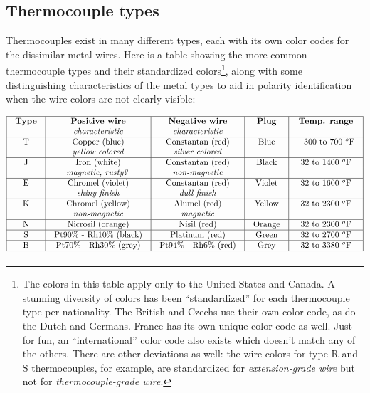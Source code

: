 \filbreak
\subsection{Thermocouple types}

Thermocouples exist in many different types, each with its own color codes for the dissimilar-metal wires.  Here is a table showing the more common thermocouple types and their standardized colors\footnote{The colors in this table apply only to the United States and Canada.  A stunning diversity of colors has been ``standardized'' for each thermocouple type per nationality.  The British and Czechs use their own color code, as do the Dutch and Germans.  France has its own unique color code as well.  Just for fun, an ``international'' color code also exists which doesn't match any of the others.  There are other deviations as well: the wire colors for type R and S thermocouples, for example, are standardized for \textit{extension-grade wire} but not for \textit{thermocouple-grade wire}.}, along with some distinguishing characteristics of the metal types to aid in polarity identification when the wire colors are not clearly visible:


$$\vbox{\offinterlineskip
\halign{\strut
\vrule \quad\hfil # \ \hfil & 
\vrule \quad\hfil # \ \hfil & 
\vrule \quad\hfil # \ \hfil & 
\vrule \quad\hfil # \ \hfil & 
\vrule \quad\hfil # \ \hfil \vrule \cr
\noalign{\hrule}
%
\textbf{Type} & \textbf{Positive wire} & \textbf{Negative wire} & \textbf{Plug} & \textbf{Temp. range} \cr
     & \textit{characteristic} & \textit{characteristic} &  & \cr
%
\noalign{\hrule}
%
T & Copper (blue) & Constantan (red) & Blue & $-300$ to 700 $^{o}$F \cr
  & \textit{yellow colored} & \textit{silver colored} &  &  \cr
%
\noalign{\hrule}
%
J & Iron (white) & Constantan (red) & Black & 32 to 1400 $^{o}$F \cr
  & \textit{magnetic, rusty?} & \textit{non-magnetic} &  &  \cr
%
\noalign{\hrule}
%
E & Chromel (violet) & Constantan (red) & Violet & 32 to 1600 $^{o}$F \cr
  & \textit{shiny finish} & \textit{dull finish} &  &  \cr
%
\noalign{\hrule}
%
K & Chromel (yellow) & Alumel (red) & Yellow & 32 to 2300 $^{o}$F \cr
  & \textit{non-magnetic} & \textit{magnetic} &  &  \cr
%
\noalign{\hrule}
%
N & Nicrosil (orange) & Nisil (red) & Orange & 32 to 2300 $^{o}$F \cr
%
\noalign{\hrule}
%
S & Pt90\% - Rh10\% (black) & Platinum (red) & Green & 32 to 2700 $^{o}$F \cr
%
\noalign{\hrule}
%
B & Pt70\% - Rh30\% (grey) & Pt94\% - Rh6\% (red) & Grey & 32 to 3380 $^{o}$F \cr
%
\noalign{\hrule}
} %
}$$ %

